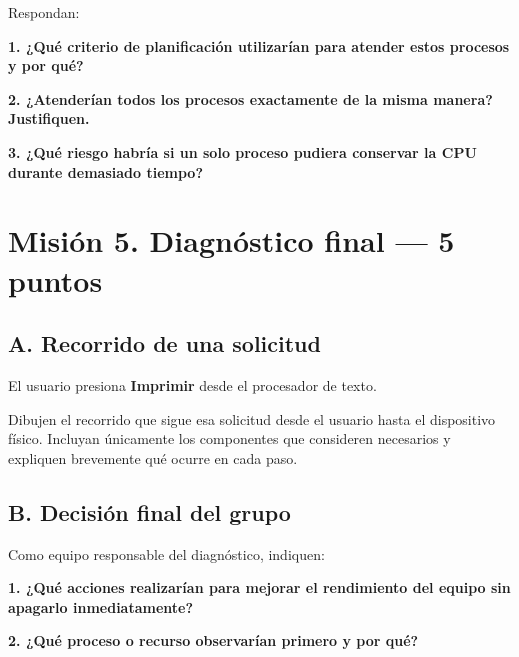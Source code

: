 \documentclass[
  spanish,
  letterpaper,
]{scrbook}
\begin{document}
Respondan:

\textbf{1. ¿Qué criterio de planificación utilizarían para atender estos
procesos y por qué?}

\vspace{2cm}

\textbf{2. ¿Atenderían todos los procesos exactamente de la misma
manera? Justifiquen.}

\vspace{1.6cm}

\textbf{3. ¿Qué riesgo habría si un solo proceso pudiera conservar la
CPU durante demasiado tiempo?}

\vspace{1.6cm}

\newpage


\chapter{Misión 5. Diagnóstico final --- 5
puntos}\label{misiuxf3n-5.-diagnuxf3stico-final-5-puntos}

\section{A. Recorrido de una
solicitud}\label{a.-recorrido-de-una-solicitud}

El usuario presiona \textbf{Imprimir} desde el procesador de texto.

Dibujen el recorrido que sigue esa solicitud desde el usuario hasta el
dispositivo físico. Incluyan únicamente los componentes que consideren
necesarios y expliquen brevemente qué ocurre en cada paso.

\vspace{5.5cm}

\section{B. Decisión final del
grupo}\label{b.-decisiuxf3n-final-del-grupo}

Como equipo responsable del diagnóstico, indiquen:

\textbf{1. ¿Qué acciones realizarían para mejorar el rendimiento del
equipo sin apagarlo inmediatamente?}

\vspace{2cm}

\textbf{2. ¿Qué proceso o recurso observarían primero y por qué?}
\end{document}
